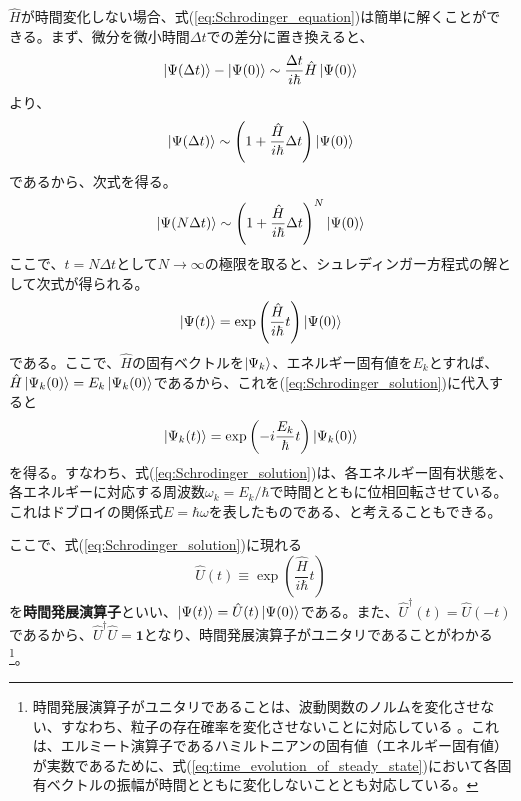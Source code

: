 $\hat H$が時間変化しない場合、式(\ref{eq:Schrodinger_equation})は簡単に解くことができる。まず、微分を微小時間$\Delta t$での差分に置き換えると、
\begin{equation}
  	\ket{\Psi(\Delta t)} - \ket{\Psi(0)} \sim \frac{\Delta t}{i\hbar}\hat H \ket{\Psi(0)}
\end{equation}
より、
\begin{equation}
  \ket{\Psi(\Delta t)} \sim \left( 1 + \frac{\hat H}{i\hbar}\Delta t\right)\ket{\Psi(0)}
\end{equation}
であるから、次式を得る。
\begin{equation}
  \ket{\Psi(N\Delta t)}\sim \left(1 + \frac{\hat H}{i\hbar}\Delta t\right)^N\ket{\Psi(0)}
\end{equation}
ここで、$t = N\Delta t$として$N \to \infty$の極限を取ると、シュレディンガー方程式の解として次式が得られる。
\begin{equation}
  \ket{\Psi(t)} = \exp \left( \frac{\hat H}{i\hbar}t \right) \ket{\Psi(0)}
  \label{eq:Schrodinger_solution}
\end{equation}
である。ここで、$\hat H$の固有ベクトルを$\ket{\Psi_k}$、エネルギー固有値を$E_k$とすれば、$\hat H \ket{\Psi_k (0)}=E_k\ket{\Psi_k (0)}$であるから、これを(\ref{eq:Schrodinger_solution})に代入すると
\begin{equation}
  \ket{\Psi_k(t)} = \exp\left(-i\frac{E_k}\hbar t\right)\ket{\Psi_k(0)}
  \label{eq:time_evolution_of_steady_state}
\end{equation}
を得る。すなわち、式(\ref{eq:Schrodinger_solution})は、各エネルギー固有状態を、各エネルギーに対応する周波数$\omega_k = E_k / \hbar$で時間とともに位相回転させている。これはドブロイの関係式$E = \hbar \omega$を表したものである、と考えることもできる。

ここで、式(\ref{eq:Schrodinger_solution})に現れる
\begin{equation}
  \hat U(t) \equiv \exp \left( \frac{\hat H}{i\hbar} t \right)
\end{equation}
を\textbf{時間発展演算子}といい、$\ket{\Psi(t)} = \hat U(t) \ket{\Psi(0)}$である。また、$\hat U ^\dagger (t) = \hat U(-t)$であるから、$\hat U^\dagger \hat U = \pmb 1$となり、時間発展演算子がユニタリであることがわかる
\footnote{時間発展演算子がユニタリであることは、波動関数のノルムを変化させない、すなわち、粒子の存在確率を変化させないことに対応している
。これは、エルミート演算子であるハミルトニアンの固有値（エネルギー固有値）が実数であるために、式(\ref{eq:time_evolution_of_steady_state})において各固有ベクトルの振幅が時間とともに変化しないこととも対応している。}。

